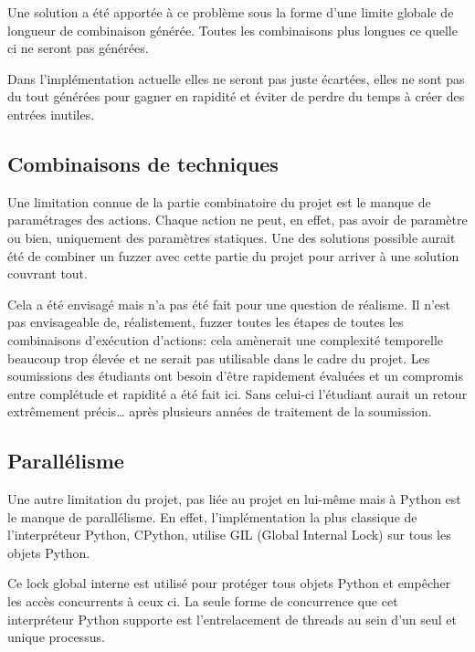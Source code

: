 \documentclass[a4paper]{report}
\begin{document}
Une solution a été apportée à ce problème sous la forme d'une limite globale de longueur de combinaison générée.
Toutes les combinaisons plus longues ce quelle ci ne seront pas générées.

Dans l'implémentation actuelle elles ne seront pas juste écartées, elles ne sont pas du tout générées pour gagner en rapidité et éviter de perdre du temps à créer des entrées inutiles.



\subsection{Combinaisons de techniques}
Une limitation connue de la partie combinatoire du projet est le manque de paramétrages des actions.
Chaque action ne peut, en effet, pas avoir de paramètre ou bien, uniquement des paramètres statiques.
Une des solutions possible aurait été de combiner un fuzzer avec cette partie du projet pour arriver à une solution couvrant tout.

Cela a été envisagé mais n'a pas été fait pour une question de réalisme.
Il n'est pas envisageable de, réalistement, fuzzer toutes les étapes de toutes les combinaisons d'exécution d'actions: cela amènerait une complexité temporelle beaucoup trop élevée et ne serait pas utilisable dans le cadre du projet.
Les soumissions des étudiants ont besoin d'être rapidement évaluées et un compromis entre complétude et rapidité a été fait ici.
Sans celui-ci l'étudiant aurait un retour extrêmement précis… après plusieurs années de traitement de la soumission.



\subsection{Parallélisme}

Une autre limitation du projet, pas liée au projet en lui-même mais à Python est le manque de parallélisme.
En effet, l'implémentation la plus classique de l'interpréteur Python, CPython, utilise GIL (Global Internal Lock) sur tous les objets Python\cite{archiveThreadStateGIDPython}.

Ce lock global interne est utilisé pour protéger tous objets Python et empêcher les accès concurrents à ceux ci.
La seule forme de concurrence que cet interpréteur Python supporte est l'entrelacement de threads au sein d'un seul et unique processus.
\end{document}
